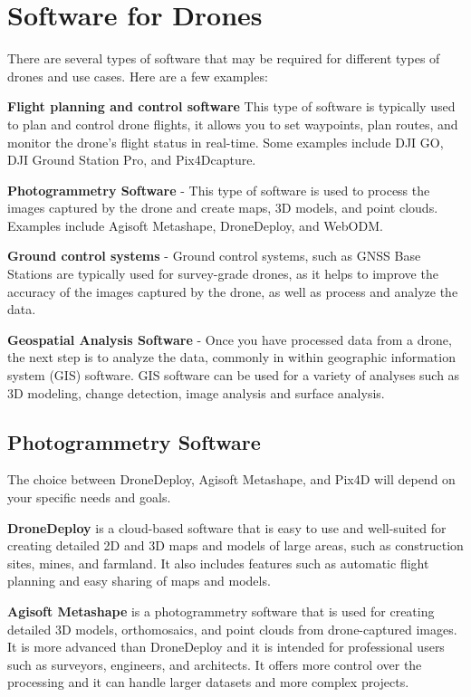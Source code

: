 \documentclass[
  12pt,
]{book}
\begin{document}
\hypertarget{software-for-drones}{%
\section{Software for Drones}\label{software-for-drones}}

There are several types of software that may be required for different types of drones and use cases. Here are a few examples:

\textbf{Flight planning and control software} This type of software is typically used to plan and control drone flights, it allows you to set waypoints, plan routes, and monitor the drone's flight status in real-time. Some examples include DJI GO, DJI Ground Station Pro, and Pix4Dcapture.

\textbf{Photogrammetry Software} - This type of software is used to process the images captured by the drone and create maps, 3D models, and point clouds. Examples include Agisoft Metashape, DroneDeploy, and WebODM.

\textbf{Ground control systems} - Ground control systems, such as GNSS Base Stations are typically used for survey-grade drones, as it helps to improve the accuracy of the images captured by the drone, as well as process and analyze the data.

\textbf{Geospatial Analysis Software} - Once you have processed data from a drone, the next step is to analyze the data, commonly in within geographic information system (GIS) software. GIS software can be used for a variety of analyses such as 3D modeling, change detection, image analysis and surface analysis.

\hypertarget{photogrammetry-software}{%
\subsection{Photogrammetry Software}\label{photogrammetry-software}}

The choice between DroneDeploy, Agisoft Metashape, and Pix4D will depend on your specific needs and goals.

\textbf{DroneDeploy} is a cloud-based software that is easy to use and well-suited for creating detailed 2D and 3D maps and models of large areas, such as construction sites, mines, and farmland. It also includes features such as automatic flight planning and easy sharing of maps and models.

\textbf{Agisoft Metashape} is a photogrammetry software that is used for creating detailed 3D models, orthomosaics, and point clouds from drone-captured images. It is more advanced than DroneDeploy and it is intended for professional users such as surveyors, engineers, and architects. It offers more control over the processing and it can handle larger datasets and more complex projects.
\end{document}
